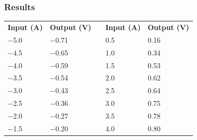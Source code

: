 \subsubsection{Results}

\begin{table}[H]
\centering
\begin{tabular}{|l|l|l| l|l|}
\cline{1-2}\cline{4-5}%
  \textbf{Input (A)}   & \textbf{Output (V)} &\phantom{hey}& \textbf{Input (A)}   & \textbf{Output (V)}\\
\cline{1-2}\cline{4-5}%
  \SI{-5,0}{}               &            \SI{-0,71}{}  &             & \SI{0,5}{}                & \SI{0,16}{}             \\
\cline{1-2}\cline{4-5}%
  \SI{-4,5}{}               &            \SI{-0,65}{}  &             & \SI{1,0}{}                & \SI{0,34}{}             \\
\cline{1-2}\cline{4-5}%
  \SI{-4,0}{}               &            \SI{-0,59}{}  &             & \SI{1,5}{} & \SI{0,53}{}             \\
\cline{1-2}\cline{4-5}%
  \SI{-3,5}{}               &            \SI{-0,54}{}  &             & \SI{2,0}{} & \SI{0,62}{}             \\
\cline{1-2}\cline{4-5}%
  \SI{-3,0}{}               &            \SI{-0,43}{}  &             & \SI{2,5}{} & \SI{0,64}{}             \\
\cline{1-2}\cline{4-5}%
  \SI{-2,5}{}               &            \SI{-0,36}{}  &             & \SI{3,0}{} & \SI{0,75}{}            \\
\cline{1-2}\cline{4-5}%
  \SI{-2,0}{}               &            \SI{-0,27}{}  &             & \SI{3,5}{}                & \SI{0,78}{}             \\
\cline{1-2}\cline{4-5}%
  \SI{-1,5}{}               &            \SI{-0,20}{}  &             & \SI{4,0}{} & \SI{0,80}{}             \\

\end{tabular}
\end{table}
